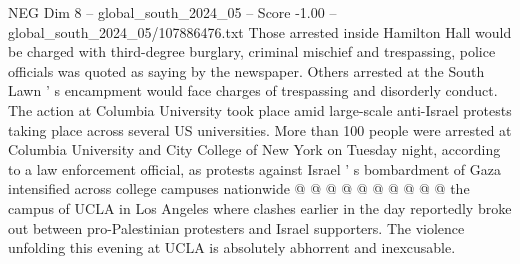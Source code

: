 \begin{textsample}{NEG Dim 8 – global\_south\_2024\_05 – Score -1.00 – global\_south\_2024\_05/107886476.txt}
Those arrested inside Hamilton Hall would be charged with third-degree burglary, criminal mischief and trespassing, police officials was quoted as saying by the newspaper.
Others arrested at the South Lawn ' s encampment would face charges of trespassing and disorderly conduct.
The action at Columbia University took place amid large-scale anti-Israel protests taking place across several US universities.
More than 100 people were arrested at Columbia University and City College of New York on Tuesday night, according to a law enforcement official, as protests against Israel ' s bombardment of Gaza intensified across college campuses nationwide @ @ @ @ @ @ @ @ @ @ the campus of UCLA in Los Angeles where clashes earlier in the day reportedly broke out between pro-Palestinian protesters and Israel supporters.
The violence unfolding this evening at UCLA is absolutely abhorrent and inexcusable.

\end{textsample}
